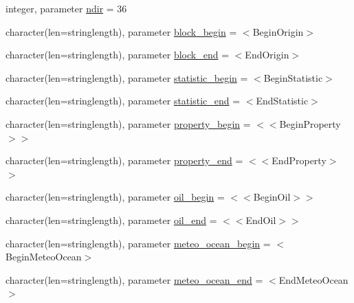 \begin{DoxyCompactItemize}
integer, parameter \mbox{\hyperlink{namespacemodulelagrangianglobal_a3b8fd26719d8ff9cf5b69201dad969f9}{ndir}} = 36
\item 
character(len=stringlength), parameter \mbox{\hyperlink{namespacemodulelagrangianglobal_adea0db2db49a67ade79b9544d59a5de4}{block\+\_\+begin}} = \textquotesingle{}$<$Begin\+Origin$>$\textquotesingle{}
\item 
character(len=stringlength), parameter \mbox{\hyperlink{namespacemodulelagrangianglobal_a9d15fdf578b0d1a82ed649a10259a691}{block\+\_\+end}} = \textquotesingle{}$<$End\+Origin$>$\textquotesingle{}
\item 
character(len=stringlength), parameter \mbox{\hyperlink{namespacemodulelagrangianglobal_ab240a04dd8bd6ec69ce08531b9b91b0e}{statistic\+\_\+begin}} = \textquotesingle{}$<$Begin\+Statistic$>$\textquotesingle{}
\item 
character(len=stringlength), parameter \mbox{\hyperlink{namespacemodulelagrangianglobal_a3bead975dd95339d652e8f1742a06da7}{statistic\+\_\+end}} = \textquotesingle{}$<$End\+Statistic$>$\textquotesingle{}
\item 
character(len=stringlength), parameter \mbox{\hyperlink{namespacemodulelagrangianglobal_a8a45bf05f084ecacb030edc3db4dcd08}{property\+\_\+begin}} = \textquotesingle{}$<$$<$Begin\+Property$>$$>$\textquotesingle{}
\item 
character(len=stringlength), parameter \mbox{\hyperlink{namespacemodulelagrangianglobal_a9bd2e46e67ee2ef39c13da350d1d13a3}{property\+\_\+end}} = \textquotesingle{}$<$$<$End\+Property$>$$>$\textquotesingle{}
\item 
character(len=stringlength), parameter \mbox{\hyperlink{namespacemodulelagrangianglobal_a516f299b20c66010fb5ab2c915c56a2b}{oil\+\_\+begin}} = \textquotesingle{}$<$$<$Begin\+Oil$>$$>$\textquotesingle{}
\item 
character(len=stringlength), parameter \mbox{\hyperlink{namespacemodulelagrangianglobal_afb1122a347d5f5a7b75ab0beb4f66b1d}{oil\+\_\+end}} = \textquotesingle{}$<$$<$End\+Oil$>$$>$\textquotesingle{}
\item 
character(len=stringlength), parameter \mbox{\hyperlink{namespacemodulelagrangianglobal_a3677833a62a1147dfe57984b42e6900e}{meteo\+\_\+ocean\+\_\+begin}} = \textquotesingle{}$<$Begin\+Meteo\+Ocean$>$\textquotesingle{}
\item 
character(len=stringlength), parameter \mbox{\hyperlink{namespacemodulelagrangianglobal_af344e4f89d0dffe74f0327c7295de4aa}{meteo\+\_\+ocean\+\_\+end}} = \textquotesingle{}$<$End\+Meteo\+Ocean$>$\textquotesingle{}

\end{DoxyCompactItemize}
